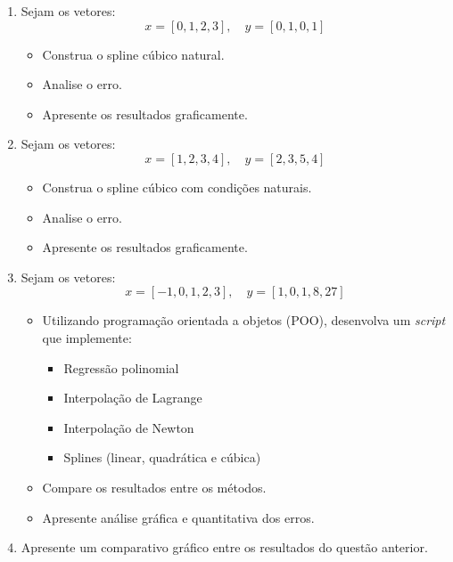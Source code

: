 \begin{enumerate}[label=\thesection.\arabic*]
\subsection*{Spline Cúbica}

\item Sejam os vetores:
\[
x = [0, 1, 2, 3], \quad y = [0, 1, 0, 1]
\]

\begin{itemize}
    \item Construa o spline cúbico natural.
    \item Analise o erro.
    \item Apresente os resultados graficamente.
\end{itemize}

\item Sejam os vetores:
\[
x = [1, 2, 3, 4], \quad y = [2, 3, 5, 4]
\]

\begin{itemize}
    \item Construa o spline cúbico com condições naturais.
    \item Analise o erro.
    \item Apresente os resultados graficamente.
\end{itemize}

\item Sejam os vetores:
\[
x = [-1, 0, 1, 2, 3], \quad y = [1, 0, 1, 8, 27]
\]

\begin{itemize}
    \item Utilizando programação orientada a objetos (POO), desenvolva um \textit{script} que implemente:
    \begin{itemize}
        \item Regressão polinomial
        \item Interpolação de Lagrange
        \item Interpolação de Newton
        \item Splines (linear, quadrática e cúbica)
    \end{itemize}
    \item Compare os resultados entre os métodos.
    \item Apresente análise gráfica e quantitativa dos erros.
\end{itemize}

\item Apresente um comparativo gráfico entre os resultados do questão anterior.

\end{enumerate}

